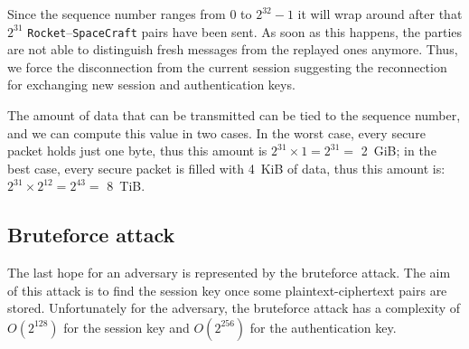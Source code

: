 \documentclass[a4paper,12pt]{article}
\begin{document}
Since the sequence number ranges from $0$ to $2^{32} - 1$ it will wrap around after that $2^{31}$ \texttt{Rocket}--\texttt{SpaceCraft} pairs have been sent.
As soon as this happens, the parties are not able to distinguish fresh messages from the replayed ones anymore.
Thus, we force the disconnection from the current session suggesting the reconnection for exchanging new session and authentication keys.

The amount of data that can be transmitted can be tied to the sequence number, and we can compute this value in two cases.
In the worst case, every secure packet holds just one byte, thus this amount is $ 2^{31} \times 1 = 2^{31} = $ 2~GiB;
in the best case, every secure packet is filled with 4~KiB of data, thus this amount is: $ 2^{31} \times 2^{12} = 2^{43} = $ 8~TiB.

\subsection{Bruteforce attack}
The last hope for an adversary is represented by the bruteforce attack.
The aim of this attack is to find the session key once some plaintext-ciphertext pairs are stored.
Unfortunately for the adversary, the bruteforce attack has a complexity of $O(2^{128})$ for the session key and $O(2^{256})$ for the authentication key.
\end{document}

